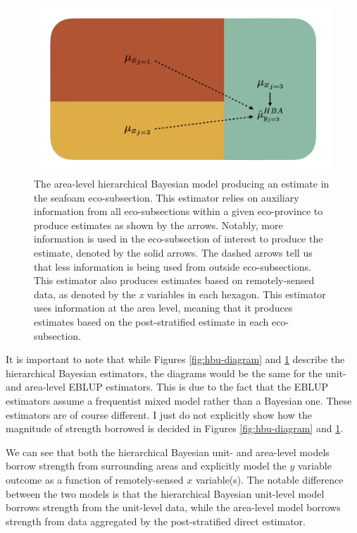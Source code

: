 \documentclass[12pt,twoside]{reedthesis}
\begin{document}
\clearpage
\begin{figure}

{\centering \includegraphics[width=1\linewidth]{figure/hba-diagram} 

}

\caption[The area-level hierarchical Bayesian model]{The area-level hierarchical Bayesian model producing an estimate in the seafoam eco-subsection. This estimator relies on auxiliary information from all eco-subsections within a given eco-province to produce estimates as shown by the arrows. Notably, more information is used in the eco-subsection of interest to produce the estimate, denoted by the solid arrows. The dashed arrows tell us that less information is being used from outside eco-subsections. This estimator also produces estimates based on remotely-sensed data, as denoted by the \textit{x} variables in each hexagon. This estimator uses information at the area level, meaning that it produces estimates based on the post-stratified estimate in each eco-subsection.}\label{fig:hba-diagram}
\end{figure}
It is important to note that while Figures \ref{fig:hbu-diagram} and \ref{fig:hba-diagram} describe the hierarchical Bayesian estimators, the diagrams would be the same for the unit- and area-level EBLUP estimators. This is due to the fact that the EBLUP estimators assume a frequentist mixed model rather than a Bayesian one. These estimators are of course different. I just do not explicitly show how the magnitude of strength borrowed is decided in Figures \ref{fig:hbu-diagram} and \ref{fig:hba-diagram}.

We can see that both the hierarchical Bayesian unit- and area-level models borrow strength from surrounding areas and explicitly model the \(y\) variable outcome as a function of remotely-sensed \(x\) variable(s). The notable difference between the two models is that the hierarchical Bayesian unit-level model borrows strength from the unit-level data, while the area-level model borrows strength from data aggregated by the post-stratified direct estimator.
\end{document}

